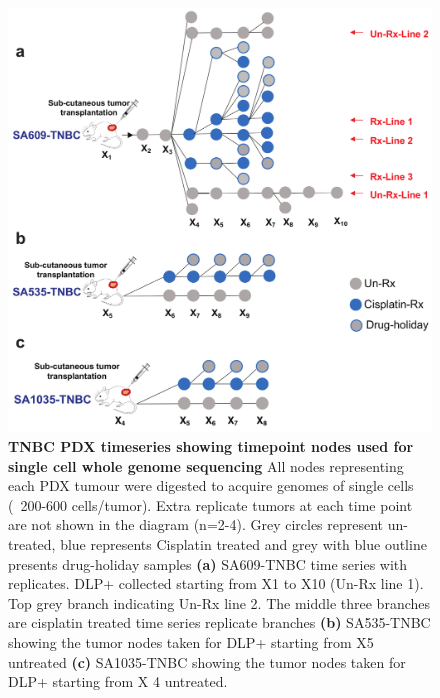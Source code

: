 \begin{figure}
\centering
\includegraphics[width=\textwidth]{Figures/treatedtimeseriesmanuscript.pdf}
	
\caption[TNBC PDX timeseries clonal dynamics under drug perturbations]
	{\small
	\textbf{TNBC PDX timeseries showing timepoint nodes used for single cell whole genome sequencing}
	     All nodes representing each PDX tumour were digested to acquire genomes of single cells (~200-600 cells/tumor). Extra replicate tumors at each time point are not shown in the diagram (n=2-4). Grey circles represent un-treated, blue represents Cisplatin treated and grey with blue outline presents drug-holiday samples  \textbf{(a)} SA609-TNBC time series with replicates. DLP+ collected starting from X1 to X10 (Un-Rx line 1). Top grey branch indicating Un-Rx line 2. The middle three branches are cisplatin treated time series replicate branches  \textbf{(b)} SA535-TNBC  showing the tumor nodes taken for DLP+ starting from X5 untreated  \textbf{(c)} SA1035-TNBC  showing the tumor nodes taken for DLP+ starting from X 4 untreated.}
	\label{fig:Untreated timeseries growth curves only}
\end{figure}




